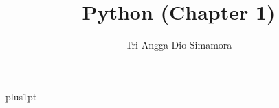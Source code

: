 \documentclass[12pt]{ociamthesis}  %
\title{Python (Chapter 1)}   %
\author{Tri Angga Dio Simamora}             %
\begin{document}
\baselineskip=18pt plus1pt

\setcounter{secnumdepth}{3}
\setcounter{tocdepth}{3}


\maketitle                  %

\begin{romanpages}          %
\tableofcontents            %
\listoffigures              %
\listoftables				%
\end{romanpages}            %







\end{document}
